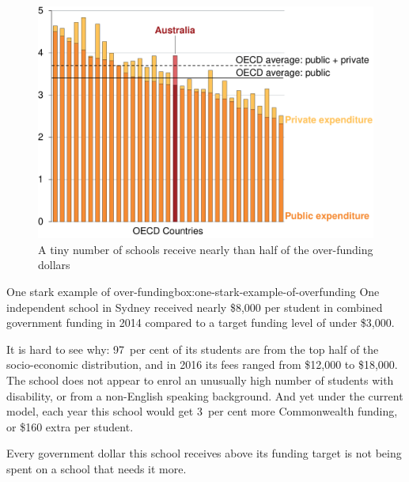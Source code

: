 \documentclass{grattan}
\begin{document}
\begin{figure}
\caption{A tiny number of schools receive nearly than half of the over-funding dollars\label{fig:more-than-half-the-overfunding-goes-to-28-schools-above-150pc-of-SRS}}

\includegraphics[page=7]{atlas/Charts.pdf}
\end{figure}
\begin{smallbox}[H]{One stark example of over-funding}{box:one-stark-example-of-overfunding}
One independent school in Sydney received nearly \$8,000 per student in combined government funding in 2014 compared to a target funding level of under \$3,000.

It is hard to see why: 97~per cent of its students are from the top half of the socio-economic distribution, and in 2016 its fees ranged from \$12,000 to \$18,000.
The school does not appear to enrol an unusually high number of students with disability, or from a non-English speaking background.
And yet under the current model, each year this school would get 3~per cent more Commonwealth funding, or \$160 extra per student.

Every government dollar this school receives above its funding target is not being spent on a school that needs it more.
\end{smallbox}

\phantom{.}

\phantom{.}
\end{document}

